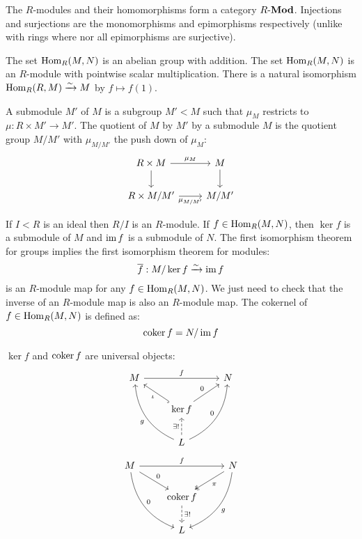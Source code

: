\begin{rmk}
	The $R$-modules and their homomorphisms form a category $R\mbox{-}\mathbf{Mod}$.
	Injections and surjections are the monomorphisms and epimorphisms respectively (unlike with rings where nor all epimorphisms are surjective).
\end{rmk}

\begin{prop}[1.3]
  	\leavevmode
	\begin{enum}
		\io The set $\operatorname{Hom}_R(M,N)$ is an abelian group with addition.
		\io The set $\operatorname{Hom}_R(M,N)$ is an $R$-module with pointwise scalar multiplication.
		\io There is a natural isomorphism $\operatorname{Hom}_R(R,M) \xrightarrow{\sim} M$ by $f \mapsto f(1)$.
	\end{enum}
\end{prop}

\begin{defn}[1.4]
  	\leavevmode
	\begin{enum}
		\io A submodule $M'$ of $M$ is a subgroup $M'<M$ such that $\mu_M$ restricts to $\mu: R \times M' \to M'$.
		\io The quotient of $M$ by $M'$ by a submodule $M$ is the quotient group $M/M'$ with $\mu_{M/M'}$ the push down of $\mu_M$:
		\[
			\begin{tikzcd}
				R \times M \arrow[r, "\mu_M"] \arrow[d] & M \arrow[d] \\
				R \times M/M' \arrow[r, "\mu_{M/M'}"'] & M/M'
			\end{tikzcd}
		\]
	\end{enum}
\end{defn}

\begin{exam}
  	\leavevmode
	\begin{enum}
		\io If $I<R$ is an ideal then $R/I$ is an $R$-module.
		\io If $f \in \operatorname{Hom}_R(M,N)$, then $\ker f$ is a submodule of $M$ and $\operatorname{im} f$ is a submodule of $N$.
		\io The first isomorphism theorem for groups implies the first isomorphism theorem for modules:
		\[\overline{f}: M/\ker f \xrightarrow{\sim} \operatorname{im} f\]
		is an $R$-module map for any $f \in \operatorname{Hom}_R(M,N)$.
		We just need to check that the inverse of an $R$-module map is also an $R$-module map.
		\io The cokernel of $f \in \operatorname{Hom}_R(M,N)$ is defined as:
		\[\operatorname{coker} f = N/\operatorname{im} f\]
	\end{enum}
\end{exam}

\begin{rmk}
	$\ker f$ and $\operatorname{coker} f$ are universal objects:
	\[
		\begin{tikzcd}
			M \arrow[rr, "f"] & & N \\
			& \ker f \arrow[ul, hook, "\iota"] \arrow[ur, "0"] & \\
			& L \arrow[uul, bend left, "g"] \arrow[uur, bend right, "0"] \arrow[u, dashed, "\exists !"] &
		\end{tikzcd}
	\]
	\[
		\begin{tikzcd}
			M \arrow[rr, "f"] \arrow[dr, "0"] \arrow[ddr, bend right, "0"] & & N \arrow[dl, twoheadrightarrow, "\pi"] \arrow[ddl, bend left, "g"] \\
			& \coker f \arrow[d, dashed, "\exists !"] & \\
			& L &
		\end{tikzcd}
	\]
\end{rmk}
